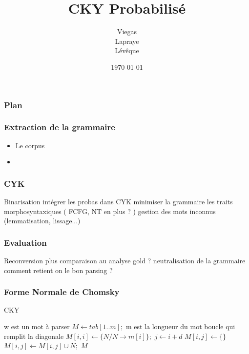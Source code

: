 \documentclass{beamer}
\begin{document}
\title{CKY Probabilisé}  %
\author{Viegas\\Lapraye\\Lévêque}

\date{\today}


\begin{frame}
 \maketitle
\end{frame}



\begin{frame} %
\frametitle{Plan}
\end{frame}

\begin{frame}
\frametitle{Extraction de la grammaire}

\begin{itemize}
 \item<1-3> Le corpus
 \item<2-3> 
\end{itemize}

 
\end{frame}

\begin{frame}
 \frametitle{CYK}
 Binarisation 
 intégrer les probas dans CYK
 minimiser la grammaire
 les traits morphosyntaxiques ( FCFG, NT en plus ? )
 gestion des mots inconnus (lemmatisation, lissage...)
 
\end{frame}

\begin{frame}
\frametitle{Evaluation}
 Reconversion plus comparaison au analyse gold
? neutralisation de la grammaire
comment retient on le bon parsing ?
\end{frame}


\frametitle{Forme Normale de Chomsky}
\begin{algorithm}
\caption{CKY}
\label{cky}
	\small{\begin{algorithmic}
		 \Comment w est un mot à parser
			\State $M \gets tab[1..m];$ \Comment m est la longueur du mot
			 \Comment boucle qui remplit la diagonale
				\State $M[i, i] \gets \{ N / N \rightarrow m[i]\};$
						\State $j \gets i+d$
						\State $M[i, j] \gets \{\}$
									\State $M[i, j] \gets M[i, j] \cup N;$
								\EndFor
							\EndFor
						\EndFor
					\EndFor
				\EndFor
			\EndFor
			\State \Return $M$
		\EndFunction
	\end{algorithmic}}
\end{algorithm}
 
\end{document}
